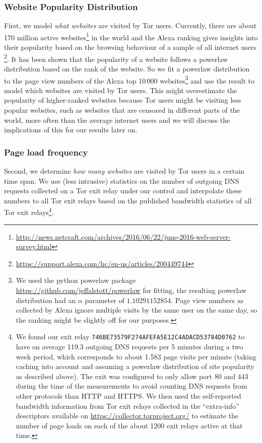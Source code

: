 \subsubsection{Website Popularity Distribution}
First, we model \emph{what websites} are visited by Tor users.
Currently, there are about 170 million active
websites\footnote{\url{http://news.netcraft.com/archives/2016/06/22/june-2016-web-server-survey.html}}
in the world and the Alexa ranking gives insights into their popularity
based on the browsing behaviour of a sample of all internet users
\footnote{\url{https://support.alexa.com/hc/en-us/articles/200449744}}.
It has been shown that the popularity of a website follows a powerlaw
distribution based on the rank of the website. So
we fit a powerlaw distribution to the page view numbers of the Alexa top
10\,000 websites\footnote{We used the python powerlaw package
		\url{https://github.com/jeffalstott/powerlaw} for fitting, the
		resulting powerlaw distribution had an $\alpha$ parameter of
		$1.10291152854$. Page view numbers as collected by Alexa ignore
		multiple visits by the same user on the same day, so the ranking
		might be slightly off for our purposes.} and use the result to
model which websites are visited by Tor users.
This might overestimate the popularity of higher-ranked websites because
Tor users might be visiting less popular websites, such as websites that
are censored in different parts of the world, more often than the
average internet users and we will discuss the implications of this for
our results later on.

\subsubsection{Page load frequency}
Second, we determine \emph{how many websites} are visited by Tor users in a
certain time span. We use (less intrusive) statistics on the number of
outgoing DNS requests collected on a Tor exit relay under our control
and interpolate these numbers to all Tor exit relays based on the
published bandwidth statistics of all Tor exit relays\footnote{We found
		our exit relay \texttt{746BE73579F274AFEFA5E12C4ADACD53784D0762}
		to have on average 119.3 outgoing DNS requests per 5 minutes
		during a two week period, which corresponds to about 1.583 page
		visits per minute (taking caching into account and assuming a
		powerlaw distribution of site popularity as described above).
		The exit was configured to only allow port 80 and 443 during the
		time of the measurements to avoid counting DNS requests from
		other protocols than HTTP and HTTPS. We then used the
		self-reported bandwidth information from Tor exit relays
		collected in the ``extra-info'' descriptors available on
		\url{https://collector.torproject.org/} to estimate the number
		of page loads on each of the about 1200 exit relays active at
		that time.}.

